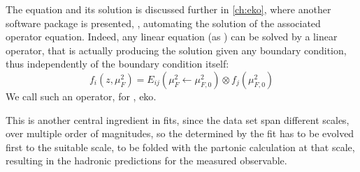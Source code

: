 The equation and its solution is discussed further in \cref{ch:eko}, where
another software package is presented, \eko, automating the solution of the
associated operator equation.
%
Indeed, any linear equation (as \dglap) can be solved by a linear operator,
that is actually producing the solution given any boundary condition, thus
independently of the boundary condition itself:
\begin{equation}
  f_i(z, \mu_F^2) = E_{ij}(\mu_F^2 \gets \mu_{F,0}^2) \otimes f_j(\mu_{F,0}^2)
\end{equation}
We call such an operator, for \dglap, \acrfull{eko}.

This is another central ingredient in \pdf fits, since the data set span
different scales, over multiple order of magnitudes, so the \pdf determined by
the fit has to be evolved first to the suitable scale, to be folded with the
partonic calculation at that scale, resulting in the hadronic predictions for
the measured observable.

